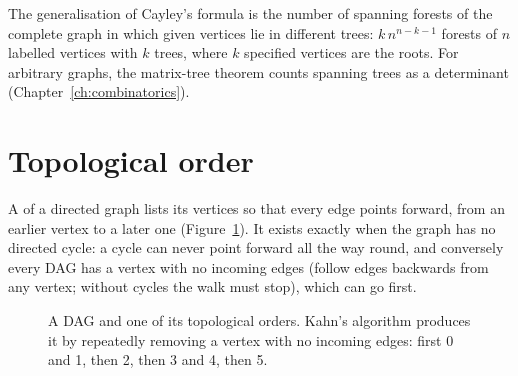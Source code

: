 \begin{trick}
The generalisation of Cayley's formula is the number of spanning forests of the complete graph in which given vertices lie in
different trees: $k\, n^{n - k - 1}$ forests of $n$ labelled vertices with $k$ trees, where $k$ specified vertices are the
roots. For arbitrary graphs, the matrix-tree theorem counts spanning trees as a determinant (Chapter~\ref{ch:combinatorics}).
\end{trick}

\section[Topological order]{Topological order \hfill \gold}\label{sec:topo}

A  of a directed graph lists its vertices so that every edge points forward, from an earlier vertex to a
later one (Figure~\ref{fig:toposort}). It exists exactly when the graph has no directed cycle: a cycle can never point forward all
the way round, and conversely every DAG has a vertex with no incoming edges (follow edges backwards from any vertex; without
cycles the walk must stop), which can go first.

\begin{figure}[htbp]
\centering
{}
\caption{A DAG and one of its topological orders. Kahn's algorithm produces it by repeatedly removing a vertex with no incoming
edges: first 0 and 1, then 2, then 3 and 4, then 5.}
\label{fig:toposort}
\end{figure}

